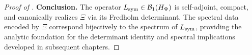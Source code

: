 \begin{proof}[Proof of ]
\medskip
\noindent\textbf{Conclusion.}
The operator \( L_{\mathrm{sym}} \in \mathcal{B}_1(H_{\Psi}) \) is self-adjoint, compact, and canonically realizes \( \Xi \) via its Fredholm determinant. The spectral data encoded by \( \Xi \) correspond bijectively to the spectrum of \( L_{\mathrm{sym}} \), providing the analytic foundation for the determinant identity and spectral implications developed in subsequent chapters.
\end{proof}
